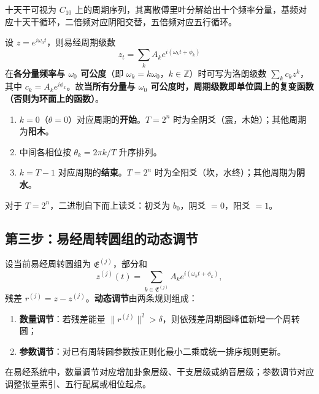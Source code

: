 \begin{example}[天干周期级数]\label{ex:yijing_tiangan_series}
十天干可视为 $C_{10}$ 上的周期序列，其离散傅里叶分解给出十个频率分量，基频对应十天干循环，二倍频对应阴阳交替，五倍频对应五行循环。
\end{example}

\begin{remark}[周期级数即复变函数]\label{rem:yijing_series_complex}
设 $z=e^{i\omega_0t}$，则易经周期级数
\[
z_t=\sum_k A_k e^{i(\omega_k t+\phi_k)}
\]
在\textbf{各分量频率与 $\omega_0$ 可公度}（即 $\omega_k=k\omega_0$，$k\in\mathbb Z$）时可写为洛朗级数 $\sum_k c_k z^k$，其中 $c_k=A_k e^{i\phi_k}$。故\textbf{当所有分量与 $\omega_0$ 可公度时，周期级数即单位圆上的复变函数（否则为环面上的函数）}。
\end{remark}

\begin{definition}[统一排序规则]\label{def:unified_ordering}
\begin{enumerate}[label=(\roman*)]
    \item $k=0$（$\theta=0$）对应周期的\textbf{开始}。$T=2^n$ 时为全阴爻（震，木始）；其他周期为\textbf{阳木}。
    \item 中间各相位按 $\theta_k = 2\pi k/T$ 升序排列。
    \item $k=T-1$ 对应周期的\textbf{结束}。$T=2^n$ 时为全阳爻（坎，水终）；其他周期为\textbf{阴水}。
\end{enumerate}
对于 $T=2^n$，二进制自下而上读爻：初爻为 $b_0$，阴爻 $=0$，阳爻 $=1$。
\end{definition}

\subsection{第三步：易经周转圆组的动态调节}

\begin{definition}[易经周转圆组的动态调节]\label{def:yijing_adaptive_adjustment}
设当前易经周转圆组为 $\mathfrak E^{(j)}$，部分和
\[
z^{(j)}(t)=\sum_{k\in\mathfrak E^{(j)}}A_k e^{i(\omega_k t+\phi_k)},
\]
残差 $r^{(j)}=z-z^{(j)}$。\textbf{动态调节}由两条规则组成：
\begin{enumerate}[label=(\roman*)]
    \item \textbf{数量调节}：若残差能量 $\|r^{(j)}\|^2>\delta$，则依残差周期图峰值新增一个周转圆；
    \item \textbf{参数调节}：对已有周转圆参数按正则化最小二乘或统一排序规则更新。
\end{enumerate}
在易经系统中，数量调节对应增加卦象层级、干支层级或纳音层级；参数调节对应调整张量索引、五行配属或相位起点。
\end{definition}

